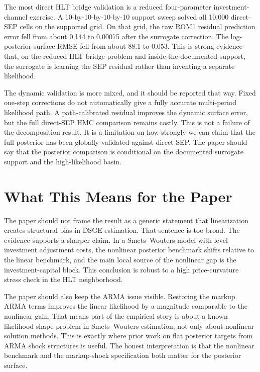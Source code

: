 \documentclass[10pt]{article}
\begin{document}
The most direct HLT bridge validation is a reduced four-parameter investment-channel exercise. A 10-by-10-by-10-by-10 support sweep solved all 10,000 direct-SEP cells on the supported grid. On that grid, the raw ROM1 residual prediction error fell from about 0.144 to 0.00075 after the surrogate correction. The log-posterior surface RMSE fell from about 88.1 to 0.053. This is strong evidence that, on the reduced HLT bridge problem and inside the documented support, the surrogate is learning the SEP residual rather than inventing a separate likelihood.

The dynamic validation is more mixed, and it should be reported that way. Fixed one-step corrections do not automatically give a fully accurate multi-period likelihood path. A path-calibrated residual improves the dynamic surface error, but the full direct-SEP HMC comparison remains costly. This is not a failure of the decomposition result. It is a limitation on how strongly we can claim that the full posterior has been globally validated against direct SEP. The paper should say that the posterior comparison is conditional on the documented surrogate support and the high-likelihood basin.

\section*{What This Means for the Paper}

The paper should not frame the result as a generic statement that linearization creates structural bias in DSGE estimation. That sentence is too broad. The evidence supports a sharper claim. In a Smets--Wouters model with level investment adjustment costs, the nonlinear posterior benchmark shifts relative to the linear benchmark, and the main local source of the nonlinear gap is the investment-capital block. This conclusion is robust to a high price-curvature stress check in the HLT neighborhood.

The paper should also keep the ARMA issue visible. Restoring the markup ARMA terms improves the linear likelihood by a magnitude comparable to the nonlinear gain. That means part of the empirical story is about a known likelihood-shape problem in Smets--Wouters estimation, not only about nonlinear solution methods. This is exactly where prior work on flat posterior targets from ARMA shock structures is useful. The honest interpretation is that the nonlinear benchmark and the markup-shock specification both matter for the posterior surface.
\end{document}
